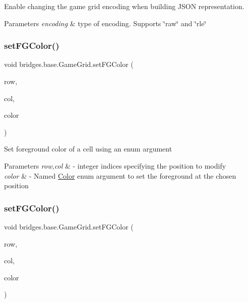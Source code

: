 Enable changing the game grid encoding when building J\+S\+ON representation. 


\begin{DoxyParams}{Parameters}
{\em encoding} & type of encoding. Supports \char`\"{}raw\char`\"{} and \char`\"{}rle\char`\"{} \\
\hline
\end{DoxyParams}
\mbox{\label{classbridges_1_1base_1_1_game_grid_a105b46f68bcc9413889e7255318bab4c}} 
\subsubsection{\texorpdfstring{set\+F\+G\+Color()}{setFGColor()}\hspace{0.1cm}{\footnotesize\ttfamily [1/2]}}
{\footnotesize\ttfamily void bridges.\+base.\+Game\+Grid.\+set\+F\+G\+Color (\begin{DoxyParamCaption}\item[{Integer}]{row,  }\item[{Integer}]{col,  }\item[{\mbox{\hyperlink{enumbridges_1_1base_1_1_named_color}{Named\+Color}}}]{color }\end{DoxyParamCaption})}

Set foreground color of a cell using an enum argument


\begin{DoxyParams}{Parameters}
{\em row,col} & -\/ integer indices specifying the position to modify \\
\hline
{\em color} & -\/ Named \mbox{\hyperlink{classbridges_1_1base_1_1_color}{Color}} enum argument to set the foreground at the chosen position \\
\hline
\end{DoxyParams}
\mbox{\label{classbridges_1_1base_1_1_game_grid_a860f2669ba46bc7691f4bb5c7adf907b}} 
\subsubsection{\texorpdfstring{set\+F\+G\+Color()}{setFGColor()}\hspace{0.1cm}{\footnotesize\ttfamily [2/2]}}
{\footnotesize\ttfamily void bridges.\+base.\+Game\+Grid.\+set\+F\+G\+Color (\begin{DoxyParamCaption}\item[{Integer}]{row,  }\item[{Integer}]{col,  }\item[{String}]{color }\end{DoxyParamCaption})}

